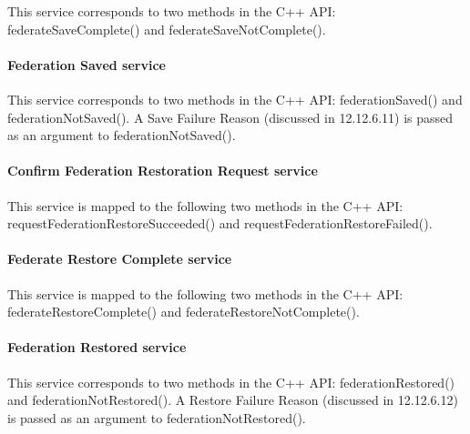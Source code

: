 \begin{compactstdpage}
    This service corresponds to two methods in the C++ API: federateSaveComplete()                                                    and federateSaveNotComplete().

    \paragraph{Federation Saved \rtiinitiated{} service}

    This service corresponds to two methods in the C++ API: federationSaved() and federationNotSaved(). A Save Failure Reason (discussed in 12.12.6.11) is passed as an argument to federationNotSaved().

    \paragraph{Confirm Federation Restoration Request \rtiinitiated{} service}

    This service is mapped to the following two methods in the C++ API: requestFederationRestoreSucceeded() and requestFederationRestoreFailed().

    \paragraph{Federate Restore Complete service}

    This service is mapped to the following two methods in the C++ API: federateRestoreComplete() and federateRestoreNotComplete().

    \paragraph{Federation Restored \rtiinitiated{} service}

    This service corresponds to two methods in the C++ API: federationRestored() and federationNotRestored(). A Restore Failure Reason (discussed in 12.12.6.12) is passed as an argument to federationNotRestored().

\end{compactstdpage}

\clearpage

